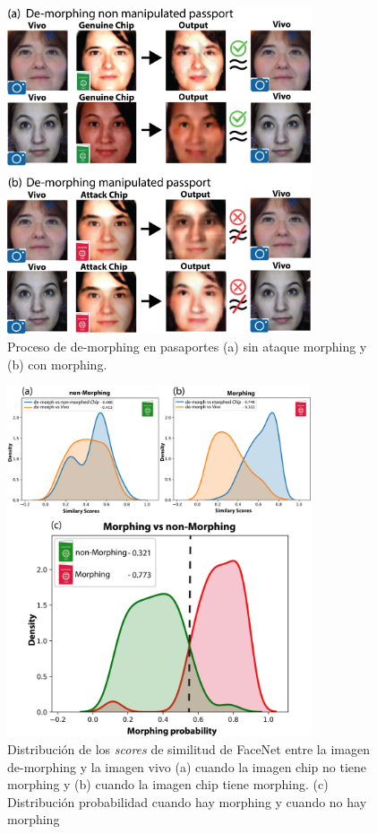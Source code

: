\begin{figure}[t!]
    \centering
    \includegraphics[width=0.8\textwidth]{ch-sistemasABC/images/ch-morphing/DemorphingCrisBeaSimple.png}
    \caption{Proceso de \gls{de-morphing} en pasaportes (a) sin ataque \gls{morphing} y (b) con \gls{morphing}.}
    \label{fig:SamplesImagesde-morphing}
\end{figure}

\begin{figure}[t!]
    \centering
    \includegraphics[width=0.8\textwidth]{ch-sistemasABC/images/ch-morphing/DIS_COMPARA_DEMO_CHIP_DEMO_VIVO_AND_MORPHING_TO_BONAFIDE.png}
    \caption{Distribución de los \textit{scores} de similitud de \gls{FaceNet} \cite{schroff2015facenet} entre la imagen \gls{de-morphing} y la imagen \gls{vivo} (a) cuando la imagen \gls{chip} no tiene \gls{morphing} y (b) cuando la imagen \gls{chip} tiene \gls{morphing}. (c) Distribución probabilidad cuando hay \gls{morphing} y cuando no hay \gls{morphing}}
    \label{fig:Distancesde-morphing}
\end{figure}

